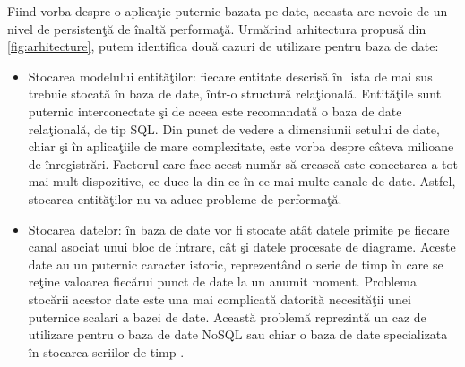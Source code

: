Fiind vorba despre o aplicaţie puternic bazata pe date, aceasta are nevoie de un nivel de persistenţă de înaltă performaţă. 
Urmărind arhitectura propusă din \cref{fig:arhitecture}, putem identifica două cazuri de utilizare pentru baza de date: 
\begin{itemize}
	\item Stocarea modelului entităţilor: fiecare entitate descrisă în lista de mai sus trebuie stocată în baza de date, într-o structură relaţională. Entităţile sunt puternic interconectate şi de aceea este recomandată o baza de date relaţională, de tip SQL. 
	Din punct de vedere a dimensiunii setului de date, chiar şi în aplicaţiile de mare complexitate, este vorba despre câteva milioane de înregistrări. Factorul care face acest număr să crească este conectarea a tot mai mult dispozitive, ce duce la din ce în ce mai multe canale de date. Astfel, stocarea entităţilor nu va aduce probleme de performaţă. 
	\item Stocarea datelor: în baza de date vor fi stocate atât datele primite pe fiecare canal asociat unui bloc de intrare, cât şi datele procesate de diagrame. Aceste date au un puternic caracter istoric, reprezentând o serie de timp în care se reţine  valoarea fiecărui punct de date la un anumit moment. Problema stocării acestor date este una mai complicată datorită necesităţii unei puternice scalari a bazei de date. Această problemă reprezintă un caz de utilizare pentru o baza de date NoSQL sau chiar o baza de date specializata în stocarea seriilor de timp \autocite{openTSDB}.  
\end{itemize}

